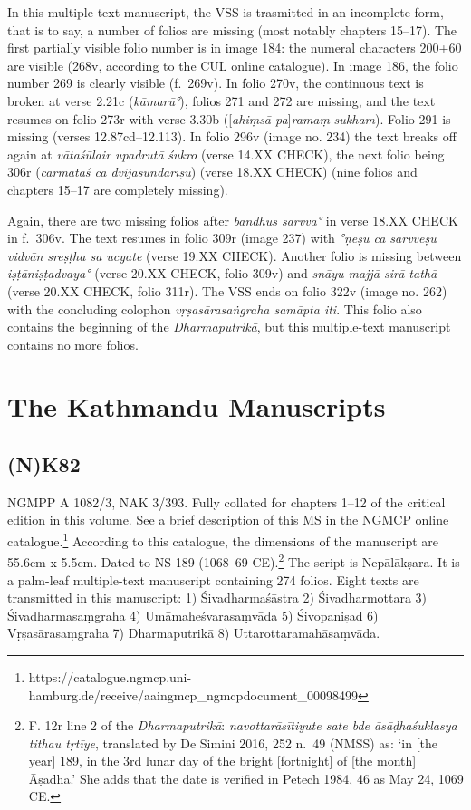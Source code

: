 \documentclass[]{article}
\begin{document}
In this multiple-text manuscript, the VSS is trasmitted in an incomplete
form, that is to say, a number of folios are missing (most notably
chapters 15--17). The first partially visible folio number is in image
184: the numeral characters 200+60 are visible (268v, according to the
CUL online catalogue). In image 186, the folio number 269 is clearly
visible (f.~269v). In folio 270v, the continuous text is broken at verse
2.21c (\emph{kāmarū°}), folios 271 and 272 are missing, and the text
resumes on folio 273r with verse 3.30b ({[}\emph{ahiṃsā
pa}{]}\emph{ramaṃ} \emph{sukham}). Folio 291 is missing (verses
12.87cd--12.113). In folio 296v (image no. 234) the text breaks off
again at \emph{vātaśūlair upadrutā} \textbar{} \emph{śukro} (verse 14.XX
CHECK), the next folio being 306r (\emph{carmatāś ca dvijasundarīṣu})
(verse 18.XX CHECK) (nine folios and chapters 15--17 are completely
missing).

Again, there are two missing folios after \emph{bandhus sarvva°} in
verse 18.XX CHECK in f.~306v. The text resumes in folio 309r (image 237)
with \emph{°ṇeṣu ca sarvveṣu vidvān sreṣṭha sa ucyate} (verse 19.XX
CHECK). Another folio is missing between \emph{iṣṭāniṣṭadvaya°} (verse
20.XX CHECK, folio 309v) and \emph{snāyu majjā sirā tathā} (verse 20.XX
CHECK, folio 311r). The VSS ends on folio 322v (image no. 262) with the
concluding colophon \emph{vṛṣasārasaṅgraha samāpta iti}. This folio also
contains the beginning of the \emph{Dharmaputrikā}, but this
multiple-text manuscript contains no more folios.

\hypertarget{the-kathmandu-manuscripts}{%
\section{The Kathmandu Manuscripts}\label{the-kathmandu-manuscripts}}

\hypertarget{nk82}{%
\subsection{(N)K82}\label{nk82}}

NGMPP A 1082/3, NAK 3/393. Fully collated for chapters 1--12 of the
critical edition in this volume. See a brief description of this MS in
the NGMCP online catalogue.\footnote{https://catalogue.ngmcp.uni-hamburg.de/receive/aaingmcp\_ngmcpdocument\_00098499}
According to this catalogue, the dimensions of the manuscript are 55.6cm
x 5.5cm. Dated to NS 189 (1068--69 CE).\footnote{F. 12r line 2 of the
  \emph{Dharmaputrikā}: \emph{navottarāsītiyute sate bde āsāḍhaśuklasya
  tithau tṛtīye}, translated by De Simini 2016, 252 n.~49 (NMSS) as: `in
  {[}the year{]} 189, in the 3rd lunar day of the bright {[}fortnight{]}
  of {[}the month{]} Āṣādha.' She adds that the date is verified in
  Petech 1984, 46 as May 24, 1069 CE.} The script is Nepālākṣara. It is
a palm-leaf multiple-text manuscript containing 274 folios. Eight texts
are transmitted in this manuscript: 1) Śivadharmaśāstra 2)
Śivadharmottara 3) Śivadharmasaṃgraha 4) Umāmaheśvarasaṃvāda 5)
Śivopaniṣad 6) Vṛṣasārasaṃgraha 7) Dharmaputrikā 8)
Uttarottaramahāsaṃvāda.
\end{document}
